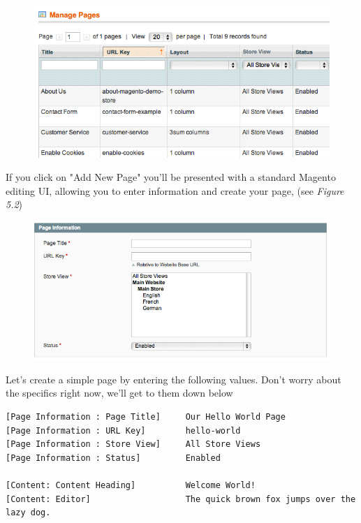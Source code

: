 \documentclass[oneside]{book}
\begin{document}
\begin{figure}[htb]
\begin{center}
\leavevmode
\includegraphics[width=1\textwidth]{images/chapter6/cms-page.png}
\end{center}
\caption{}
\end{figure}


If you click on "Add New Page" you'll be presented with a standard Magento editing UI, allowing you to enter information and create your page, (see \emph{Figure 5.2}) 

\begin{figure}[htb]
\begin{center}
\leavevmode
\includegraphics[width=1\textwidth]{images/chapter6/page-info.png}
\end{center}
\caption{}
\end{figure}


Let's create a simple page by entering the following values.  Don't worry about the specifics right now, we'll get to them down below

\begin{lstlisting}
[Page Information : Page Title]     Our Hello World Page
[Page Information : URL Key]        hello-world
[Page Information : Store View]     All Store Views
[Page Information : Status]         Enabled

[Content: Content Heading]          Welcome World!
[Content: Editor]                   The quick brown fox jumps over the lazy dog.

\end{lstlisting}
\end{document}
